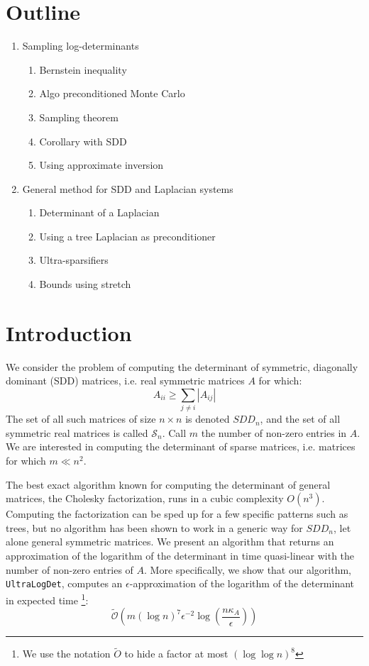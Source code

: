
\section*{Outline}
\begin{enumerate}
\item Sampling log-determinants

\begin{enumerate}
\item Bernstein inequality 
\item Algo preconditioned Monte Carlo 
\item Sampling theorem 
\item Corollary with SDD 
\item Using approximate inversion
\end{enumerate}
\item General method for SDD and Laplacian systems

\begin{enumerate}
\item Determinant of a Laplacian 
\item Using a tree Laplacian as preconditioner
\item Ultra-sparsifiers
\item Bounds using stretch
\end{enumerate}
\end{enumerate}

\section{Introduction}

We consider the problem of computing the determinant of symmetric,
diagonally dominant (SDD) matrices, i.e. real symmetric matrices $A$
for which: 
\[
A_{ii}\geq\sum_{j\neq i}\left|A_{ij}\right|
\]
The set of all such matrices of size $n\times n$ is denoted $SDD_{n}$,
and the set of all symmetric real matrices is called $\mathcal{S}_{n}$.
Call $m$ the number of non-zero entries in $A$. We are interested
in computing the determinant of sparse matrices, i.e. matrices for
which $m\ll n^{2}$.

The best exact algorithm known for computing the determinant of general
matrices, the Cholesky factorization, runs in a cubic complexity $O\left(n^{3}\right)$.
Computing the factorization can be sped up for a few specific patterns
such as trees, but no algorithm has been shown to work in a generic
way for $SDD_{n}$, let alone general symmetric matrices. We present
an algorithm that returns an approximation of the logarithm of the
determinant in time quasi-linear with the number of non-zero entries
of $A$. More specifically, we show that our algorithm, \texttt{UltraLogDet},
computes an $\epsilon$-approximation of the logarithm of the determinant
in expected time%
\footnote{We use the notation $\tilde{O}$ to hide a factor at most $\left(\log\log n\right)^{8}$%
}: 
\[
\tilde{\mathcal{O}}\left(m\left(\log n\right)^{7}\epsilon^{-2}\log\left(\frac{n\kappa_{A}}{\epsilon}\right)\right)
\]


